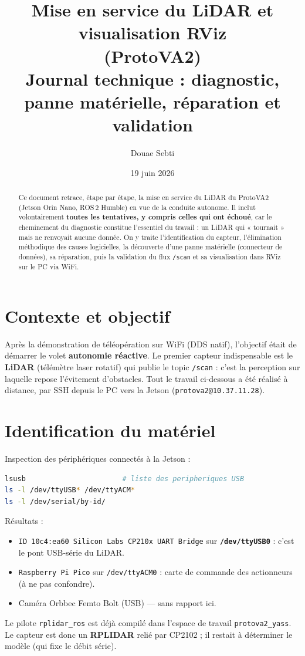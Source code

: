 \documentclass[a4paper,11pt]{article}
\title{\textbf{Mise en service du LiDAR et visualisation RViz\\ (ProtoVA2)}\\[2mm]
\large Journal technique : diagnostic, panne matérielle, réparation et validation}
\author{Douae Sebti}
\date{19 juin 2026}
\begin{document}
\maketitle

\begin{abstract}
\noindent Ce document retrace, étape par étape, la mise en service du LiDAR du
ProtoVA2 (Jetson Orin Nano, ROS\,2 Humble) en vue de la conduite autonome.
Il inclut volontairement \textbf{toutes les tentatives, y compris celles qui ont
échoué}, car le cheminement du diagnostic constitue l'essentiel du travail : un
LiDAR qui « tournait » mais ne renvoyait aucune donnée. On y traite
l'identification du capteur, l'élimination méthodique des causes logicielles, la
découverte d'une panne matérielle (connecteur de données), sa réparation, puis
la validation du flux \texttt{/scan} et sa visualisation dans RViz sur le PC via
WiFi.
\end{abstract}

\tableofcontents
\bigskip

\section{Contexte et objectif}
Après la démonstration de téléopération sur WiFi (DDS natif), l'objectif était
de démarrer le volet \textbf{autonomie réactive}. Le premier capteur
indispensable est le \textbf{LiDAR} (télémètre laser rotatif) qui publie le
topic \texttt{/scan} : c'est la perception sur laquelle repose l'évitement
d'obstacles. Tout le travail ci-dessous a été réalisé à distance, par SSH depuis
le PC vers la Jetson (\texttt{protova2@10.37.11.28}).

\section{Identification du matériel}
Inspection des périphériques connectés à la Jetson :
\begin{lstlisting}[language=bash]
lsusb                       # liste des peripheriques USB
ls -l /dev/ttyUSB* /dev/ttyACM*
ls -l /dev/serial/by-id/
\end{lstlisting}

\noindent Résultats :
\begin{itemize}[leftmargin=1.4em]
  \item \texttt{ID 10c4:ea60 Silicon Labs CP210x UART Bridge} sur
        \textbf{\texttt{/dev/ttyUSB0}} : c'est le pont USB-série du LiDAR.
  \item \texttt{Raspberry Pi Pico} sur \texttt{/dev/ttyACM0} : carte de commande
        des actionneurs (à ne pas confondre).
  \item Caméra Orbbec Femto Bolt (USB) — sans rapport ici.
\end{itemize}
Le pilote \texttt{rplidar\_ros} est déjà compilé dans l'espace de travail
\texttt{protova2\_yass}. Le capteur est donc un \textbf{RPLIDAR} relié par
CP2102 ; il restait à déterminer le modèle (qui fixe le débit série).
\end{document}
